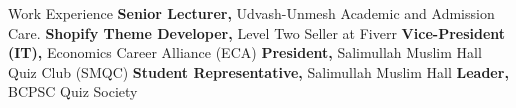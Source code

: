 \begin{rubric}{Work Experience}
%
	\textbf{Senior Lecturer,} Udvash-Unmesh Academic and Admission Care.
%
\entry*[2020 -- 2023]%
	\textbf{Shopify Theme Developer,} Level Two Seller at Fiverr
%
\entry*[2021 -- 2022]%
	\textbf{Vice-President (IT),} Economics Career Alliance (ECA)
%
\entry*[2019 -- 2020]%
	\textbf{President,} Salimullah Muslim Hall Quiz Club (SMQC)
%
\entry*[1/7/2019 -- 2019]%
	\textbf{Student Representative,} Salimullah Muslim Hall
%
\entry*[2016-2017]%
	\textbf{Leader,} BCPSC Quiz Society
%
%

%
\end{rubric}
